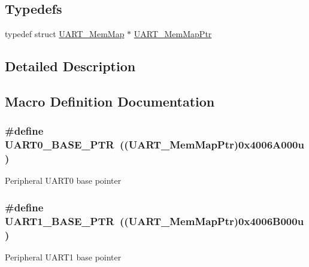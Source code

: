 \subsection*{Typedefs}
\begin{DoxyCompactItemize}
\item 
typedef struct \hyperlink{struct_u_a_r_t___mem_map}{U\+A\+R\+T\+\_\+\+Mem\+Map} $\ast$ \hyperlink{group___u_a_r_t___peripheral_ga306cf44b593fadbb29a065f42e3f68f0}{U\+A\+R\+T\+\_\+\+Mem\+Map\+Ptr}
\end{DoxyCompactItemize}


\subsection{Detailed Description}


\subsection{Macro Definition Documentation}
\hypertarget{group___u_a_r_t___peripheral_ga50a02c91ffbd11fa7b4f0c33fe585199}{}
\subsubsection[{U\+A\+R\+T0\+\_\+\+B\+A\+S\+E\+\_\+\+P\+T\+R}]{\setlength{\rightskip}{0pt plus 5cm}\#define U\+A\+R\+T0\+\_\+\+B\+A\+S\+E\+\_\+\+P\+T\+R~(({\bf U\+A\+R\+T\+\_\+\+Mem\+Map\+Ptr})0x4006\+A000u)}\label{group___u_a_r_t___peripheral_ga50a02c91ffbd11fa7b4f0c33fe585199}
Peripheral U\+A\+R\+T0 base pointer \hypertarget{group___u_a_r_t___peripheral_gafb5b1236c1cdf2d9a6464251b791030c}{}
\subsubsection[{U\+A\+R\+T1\+\_\+\+B\+A\+S\+E\+\_\+\+P\+T\+R}]{\setlength{\rightskip}{0pt plus 5cm}\#define U\+A\+R\+T1\+\_\+\+B\+A\+S\+E\+\_\+\+P\+T\+R~(({\bf U\+A\+R\+T\+\_\+\+Mem\+Map\+Ptr})0x4006\+B000u)}\label{group___u_a_r_t___peripheral_gafb5b1236c1cdf2d9a6464251b791030c}
Peripheral U\+A\+R\+T1 base pointer \hypertarget{group___u_a_r_t___peripheral_ga75ca2ea4e490b3c1c7aa55fc9c25cd37}{}
